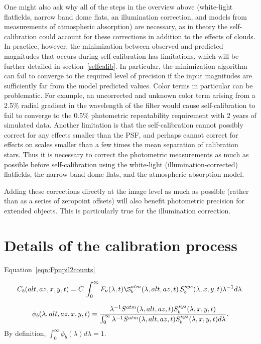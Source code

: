\documentclass[12pt,preprint]{aastex}
\begin{document}
One might also ask why all of the steps in the overview above
(white-light flatfields, narrow band dome flats, an illumination
correction, and models from measurements of atmospheric absorption)
are necessary, as in theory the self-calibration could account for
these corrections in addition to the effects of clouds. In practice,
however, the minimization between observed and predicted magnitudes
that occurs during self-calibration has limitations, which will be
further detailed in section~\ref{selfcalib}.  In particular, the
minimization algorithm can fail to converge to the required level of
precision if the input magnitudes are sufficiently far from the model
predicted values.  Color terms in particular can be problematic. For
example, an uncorrected and unknown color term arising from a 2.5\%
radial gradient in the wavelength of the filter would cause
self-calibration to fail to converge to the 0.5\% photometric
repeatability requirement with 2 years of simulated data. Another
limitation is that the self-calibration cannot possibly correct for
any effects smaller than the PSF, and perhaps cannot correct for
effects on scales smaller than a few times the mean separation of
calibration stars. Thus it is necessary to correct the photometric
measurements as much as possible before self-calibration using the
white-light (illumination-corrected) flatfields, the narrow band dome
flats, and the atmospheric absorption model.

Adding these corrections directly at the image level as much as
possible (rather than as a series of zeropoint offsets) will also
benefit photometric precision for extended objects. This is
particularly true for the illumination correction.

\section{Details of the calibration process}

Equation~\ref{eqn:Fpupil2counts} 

\begin{equation}
\label{eqn:fullcounts}
C_b(alt,az,x,y,t) = C \, \int_0^\infty {F_\nu(\lambda,t)
  \S_b^{atm}(\lambda,alt,az,t) \, S_b^{sys}(\lambda,x,y,t) \lambda^{-1}d\lambda}.
\end{equation}

\begin{equation}
\label{PhiDef}
   \phi_b(\lambda,alt,az,x,y,t) = {\lambda^{-1}
     S^{atm}(\lambda,alt,az,t) S_b^{sys}(\lambda,x,y,t) \over
     \int_0^\infty {\lambda^{-1} S^{atm}(\lambda,alt,az,t) S_b^{sys}(\lambda,x,y,t) d\lambda}}.
\end{equation}
By definition, $\int_0^\infty {\phi_b(\lambda) d\lambda}=1$.
\end{document}
